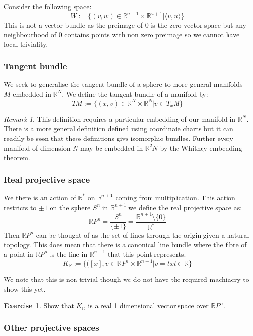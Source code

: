 \documentclass[a4paper,10pt]{article}
\theoremstyle{plain}%
\theoremstyle{definition}
\newtheorem{exer}{Exercise}
\theoremstyle{remark}
\newtheorem{rem}{Remark}
\newcommand{\RR}{\mathbb{R}}
\begin{document}
Consider the following space:
$$W:=\{ (v,w) \in \RR^{n+1}\times \RR^{n+1} | \langle v,w \rangle \}$$
This is not a vector bundle as the preimage of $0$ is the zero vector space but any neighbourhood of $0$ 
contains points with non zero preimage so we cannot have local triviality.

\subsubsection{Tangent bundle}

We seek to generalise the tangent bundle of a sphere to more general manifolds $M$ embedded in $\RR^N$.
We define the tangent bundle of a manifold by:
$$TM:=\{ (x,v)\in \RR^N\times\RR^N | v\in T_xM \}$$

\begin{rem}
 This definition requires a particular embedding of our manifold in $\RR^N$. There is a more general definition
defined using coordinate charts but it can readily be seen that these definitions give isomorphic bundles. Further 
every manifold of dimension $N$ may be embedded in $\RR^2N$ by the Whitney embedding theorem. 
\end{rem}


\subsubsection{Real projective space}

We there is an action of $\RR^\ast$ on $\RR^{n+1}$ coming from multiplication. This action restricts to $\pm 1$ on 
the sphere $S^n$ in $\RR^{n+1}$ we define the real projective space as:
$$\RR P^n = \frac{S^n}{\{\pm 1\}} = \frac{\RR^{n+1}\setminus\{0\}}{\RR^\ast}$$
Then $\RR P^n$ can be thought of as the set of lines through the origin given a natural topology. This does mean 
that there is a canonical line bundle where the fibre of a point in $\RR P^n$ is the line in $\RR^{n+1}$ that this 
point represents.
$$K_\RR := \{ ([x],v\in \RR P^n\times \RR^{n+1} | v=tx t\in \RR\}$$

We note that this is non-trivial though we do not have the required machinery to show this yet.

\begin{exer}
 Show that $K_\RR$ is a real 1 dimensional vector space over $\RR P^n$.
\end{exer}


\subsubsection{Other projective spaces}
\end{document}
